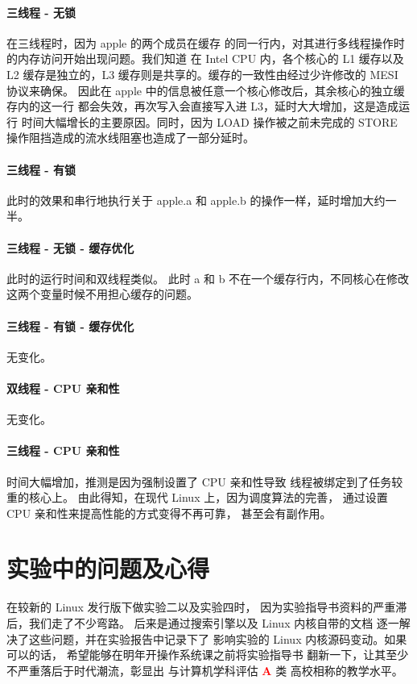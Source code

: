 \documentclass[blue,normal,cn]{elegantnote}
\begin{document}
\paragraph{三线程 - 无锁} 在三线程时，因为 apple 的两个成员在缓存
的同一行内，对其进行多线程操作时的内存访问开始出现问题。我们知道
在 Intel CPU 内，各个核心的 L1 缓存以及 L2 缓存是独立的，L3 
缓存则是共享的。缓存的一致性由经过少许修改的 MESI 协议来确保。
因此在 apple 中的信息被任意一个核心修改后，其余核心的独立缓存内的这一行
都会失效，再次写入会直接写入进 L3，延时大大增加，这是造成运行
时间大幅增长的主要原因。同时，因为 LOAD 操作被之前未完成的 STORE 
操作阻挡造成的流水线阻塞也造成了一部分延时。

\paragraph{三线程 - 有锁}
此时的效果和串行地执行关于 apple.a 和 apple.b 的操作一样，延时增加大约一半。

\paragraph{三线程 - 无锁 - 缓存优化}
此时的运行时间和双线程类似。
此时 a 和 b 不在一个缓存行内，不同核心在修改这两个变量时候不用担心缓存的问题。

\paragraph{三线程 - 有锁 - 缓存优化}
无变化。

\paragraph{双线程 - CPU 亲和性}
无变化。

\paragraph{三线程 - CPU 亲和性}
时间大幅增加，推测是因为强制设置了 CPU 亲和性导致
线程被绑定到了任务较重的核心上。
由此得知，在现代 Linux 上，因为调度算法的完善，
通过设置 CPU 亲和性来提高性能的方式变得不再可靠，
甚至会有副作用。

\section{实验中的问题及心得}

在较新的 Linux 发行版下做实验二以及实验四时，
因为实验指导书资料的严重滞后，我们走了不少弯路。
后来是通过搜索引擎以及 Linux 内核自带的文档
逐一解决了这些问题，并在实验报告中记录下了
影响实验的 Linux 内核源码变动。如果可以的话，
希望能够在明年开操作系统课之前将实验指导书
翻新一下，让其至少不严重落后于时代潮流，彰显出
与计算机学科评估 {\textcolor{red}{\LARGE{\textbf{A}}}} 类
高校相称的教学水平。
\end{document}
